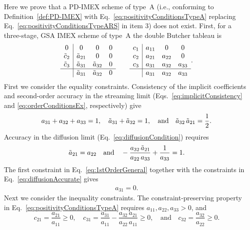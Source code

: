 Here we prove that a PD-IMEX scheme  of type~A (i.e., conforming to Definition~\ref{def:PD-IMEX} with Eq.~\eqref{eq:positivityConditionsTypeA} replacing Eq.~\eqref{eq:positivityConditionsTypeARS} in item 3) does not exist.  
First, for a three-stage, GSA IMEX scheme of type~A the double Butcher tableau is
\begin{equation*}
  \begin{array}{c | c c c}
  	      0       & 0              & 0              & 0 \\
  	\tilde{c}_{2} & \tilde{a}_{21} & 0              & 0 \\
  	\tilde{c}_{3} & \tilde{a}_{31} & \tilde{a}_{32} & 0 \\ \hline
  	              & \tilde{a}_{31} & \tilde{a}_{32} & 0
  \end{array}
  \qquad
  \begin{array}{c | c c c}
    c_{1} & a_{11} & 0      & 0      \\
  	c_{2} & a_{21} & a_{22} & 0      \\
  	c_{3} & a_{31} & a_{32} & a_{33} \\ \hline
  	      & a_{31} & a_{32} & a_{33}
  \end{array}.
\end{equation*}
First we consider the equality constraints.  
Consistency of the implicit coefficients and second-order accuracy in the streaming limit (Eqs.~\eqref{eq:implicitConsistency} and \eqref{eq:orderConditionsEx}, respectively) give
\begin{align}
  a_{31} + a_{32} + a_{33} = 1, \quad \tilde{a}_{31} + \tilde{a}_{32} = 1, \quad \text{and}\quad \tilde{a}_{32}\,\tilde{a}_{21} =  \frac{1}{2}.
  \label{eq:1stOrderGeneral}
\end{align}
Accuracy in the diffusion limit (Eq.~\eqref{eq:diffusionCondition}) requires 
\begin{align}
  \tilde{a}_{21} = a_{22}
  \quad\text{and}\quad 
  -\frac{a_{32}\,\tilde{a}_{21}}{a_{22}\,a_{33}} + \frac{1}{a_{33}} = 1.
\label{eq:diffusionAccurate}
\end{align}
The first constraint in Eq.~\eqref{eq:1stOrderGeneral} together with the constraints in Eq.~\eqref{eq:diffusionAccurate} gives
\begin{align}
  a_{31} = 0.
  \label{eq:a31is0}
\end{align}
Next we consider the inequality constraints.  
The constraint-preserving property in Eq.~\eqref{eq:positivityConditionsTypeA} requires $a_{11}, a_{22}, a_{33}>0$, and 
\begin{equation}
  c_{21} = \frac{a_{21}}{a_{11}} \geq 0, \quad
  c_{31} = \frac{a_{31}}{a_{11}} - \frac{a_{32}\,a_{21}}{a_{22}\,a_{11}} \geq 0, \quad\text{and}\quad
  c_{32} = \frac{a_{32}}{a_{22}} \geq 0.
  \label{eq:constraintsTypeA}
\end{equation}
